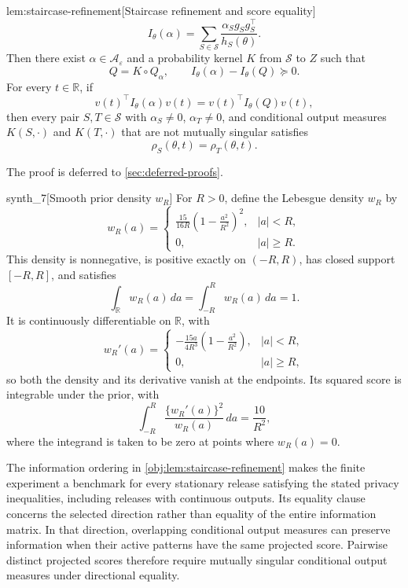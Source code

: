 \documentclass[11pt]{article}
\begin{document}
\begin{lemmav}{lem:staircase-refinement}[Staircase refinement and score equality]
\[
I_\theta(\alpha)
=
\sum_{S\in\mathcal S}
\frac{\alpha_S g_Sg_S^\top}{h_S(\theta)}.
\]
Then there exist \(\alpha\in\mathcal A_\varepsilon\) and a probability kernel \(K\) from \(\mathcal S\) to \(Z\) such that
\[
Q=K\circ Q_\alpha,
\qquad
I_\theta(\alpha)-I_\theta(Q)\succeq0.
\]
For every \(t\in\mathbb R\), if
\[
v(t)^\top I_\theta(\alpha)v(t)
=
v(t)^\top I_\theta(Q)v(t),
\]
then every pair \(S,T\in\mathcal S\) with \(\alpha_S\ne0\), \(\alpha_T\ne0\), and conditional output measures \(K(S,\cdot)\) and \(K(T,\cdot)\) that are not mutually singular satisfies
\[
\rho_S(\theta,t)=\rho_T(\theta,t).
\]
\end{lemmav}

The proof is deferred to \cref{sec:deferred-proofs}.

\begin{definitionv}{synth_7}[Smooth prior density \(w_R\)]
For \(R>0\), define the Lebesgue density \(w_R\) by
\[
w_R(a)=
\begin{cases}
\displaystyle\frac{15}{16R}\left(1-\frac{a^2}{R^2}\right)^2,
& |a|<R,\\[6pt]
0,& |a|\ge R.
\end{cases}
\]
This density is nonnegative, is positive exactly on \((-R,R)\), has closed support \([-R,R]\), and satisfies
\[
\int_{\mathbb R}w_R(a)\,da
=\int_{-R}^{R}w_R(a)\,da=1.
\]
It is continuously differentiable on \(\mathbb R\), with
\[
w_R'(a)=
\begin{cases}
\displaystyle-\frac{15a}{4R^3}\left(1-\frac{a^2}{R^2}\right),
& |a|<R,\\[6pt]
0,& |a|\ge R,
\end{cases}
\]
so both the density and its derivative vanish at the endpoints. Its squared score is integrable under the prior, with
\[
\int_{-R}^{R}
\frac{\{w_R'(a)\}^2}{w_R(a)}\,da=\frac{10}{R^2},
\]
where the integrand is taken to be zero at points where \(w_R(a)=0\).
\end{definitionv}

The information ordering in \cref{obj:lem:staircase-refinement} makes the finite experiment a benchmark for every stationary release satisfying the stated privacy inequalities, including releases with continuous outputs. Its equality clause concerns the selected direction rather than equality of the entire information matrix. In that direction, overlapping conditional output measures can preserve information when their active patterns have the same projected score. Pairwise distinct projected scores therefore require mutually singular conditional output measures under directional equality.
\end{document}
